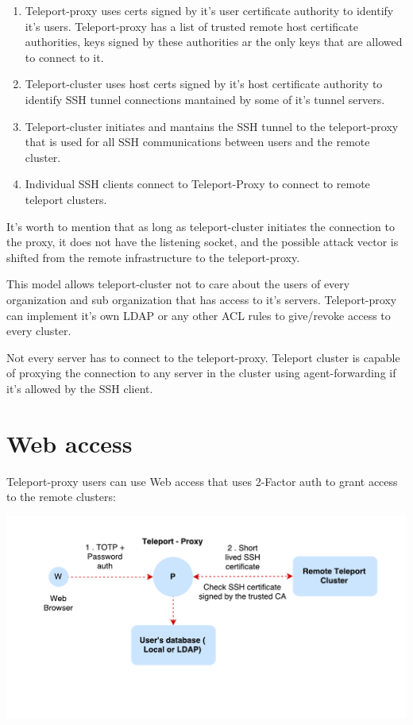 \documentclass{res}
\begin{document}
\begin{resume}
    \begin{enumerate} %
      \item Teleport-proxy uses certs signed by it's user certificate authority to identify it's users. Teleport-proxy has a list of trusted remote host certificate authorities, keys signed by these authorities ar the only keys that are allowed to connect to it.
      \item Teleport-cluster uses host certs signed by it's host certificate authority to identify SSH tunnel connections mantained by some of it's tunnel servers.
      \item Teleport-cluster initiates and mantains the SSH tunnel to the teleport-proxy that is used for all SSH communications between users and the remote cluster.
      \item Individual SSH clients connect to Teleport-Proxy to connect to remote teleport clusters.    
    \end{enumerate}

    It's worth to mention that as long as teleport-cluster initiates the connection to the proxy, it does not have the listening socket, and the possible attack vector is shifted from the remote infrastructure to the teleport-proxy.

    This model allows teleport-cluster not to care about the users of every organization and sub organization that has access to it's servers. Teleport-proxy can implement it's own LDAP or any other ACL rules to give/revoke access to every cluster.

    Not every server has to connect to the teleport-proxy. Teleport cluster is capable of proxying the connection to any server in the cluster using agent-forwarding if it's allowed by the SSH client.

\section{Web access}
\vspace{0.1in}

    Teleport-proxy users can use Web access that uses 2-Factor auth to grant access to the remote clusters:
 
    \includegraphics[scale=0.8]{./images/teleport-web.pdf}



\end{resume}
\end{document}
